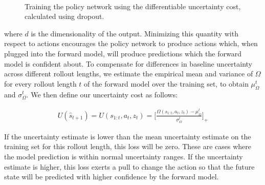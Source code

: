 \documentclass{article} %
\begin{document}
\begin{figure}[t!]
    \centering
     \\
    \label{planning-methods}
    \caption{Training the policy network using the differentiable uncertainty cost, calculated using dropout.}
\end{figure}




where $d$ is the dimensionality of the output. Minimizing this quantity with respect to actions encourages the policy network to produce actions which, when plugged into the forward model, will produce predictions which the forward model is confident about.
    To compensate for differences in baseline uncertainty across different rollout lengths, we estimate the empirical mean and variance of $\Omega$ for every rollout length $t$ of the forward model over the training set, to obtain $\mu_{\Omega}^t$ and $\sigma_{\Omega}^t$. We then define our uncertainty cost as follows:

    \begin{align}
      U(\hat{s}_{t+1}) = U(s_{1:t}, a_t, z_t) = \Big [ \frac{\Omega(s_{1:t}, a_t, z_t) - \mu_\Omega^t}{\sigma_\Omega^t} \Big]_+
    \end{align}

    If the uncertainty estimate is lower than the mean uncertainty estimate on the training set for this rollout length, this loss will be zero.
    These are cases where the model prediction is within normal uncertainty ranges. If the uncertainty estimate is higher, this loss exerts a pull to change the action so that the future state will be predicted with higher confidence by the forward model.
\end{document}
